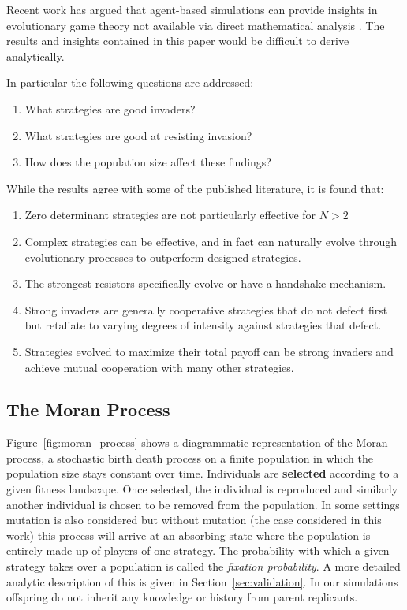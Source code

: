 \documentclass{article}
\begin{document}
Recent work has argued that agent-based
simulations can provide insights in evolutionary game theory not available
via direct mathematical analysis \cite{adami2016evolutionary}. The results
and insights contained in this paper would be difficult to derive analytically.

In particular the following questions are addressed:
\begin{enumerate}
    \item What strategies are good invaders?
    \item What strategies are good at resisting invasion?
    \item How does the population size affect these findings?
\end{enumerate}

While the results agree with some of the published literature, it is found that:

\begin{enumerate}
 \item Zero determinant strategies are not particularly effective for $N > 2$
 \item Complex strategies can be effective, and in fact can naturally evolve
     through evolutionary processes to outperform designed strategies.
 \item The strongest resistors specifically evolve or have a handshake mechanism.
 \item Strong invaders are generally cooperative strategies that do not defect
 first but retaliate to varying degrees of intensity against strategies that defect.
 \item Strategies evolved to maximize their total payoff can be strong invaders
 and achieve mutual cooperation with many other strategies.
\end{enumerate}

\subsection{The Moran Process}\label{sec:the_moran_process}

Figure~\ref{fig:moran_process} shows a diagrammatic representation of the Moran
process, a stochastic birth death process on a finite population in which the
population size stays constant over time. Individuals are \textbf{selected}
according to a given fitness landscape. Once selected, the individual is
reproduced and similarly another individual is chosen to be removed from the
population. In some settings mutation is also considered but without mutation
(the case considered in this work) this process will arrive at an absorbing
state where the population is entirely made up of players of one strategy. The
probability with which a given strategy takes over a population is called the
\textit{fixation probability}. A more detailed analytic description of this is
given in Section~\ref{sec:validation}. In our simulations offspring do not
inherit any knowledge or history from parent replicants.
\end{document}
